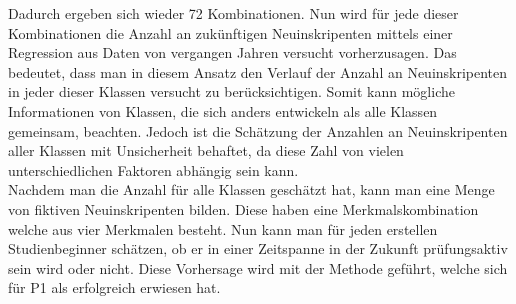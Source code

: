 \noindent Dadurch ergeben sich wieder 72 Kombinationen. Nun wird f\"ur jede dieser Kombinationen die Anzahl an zuk\"unftigen Neuinskripenten mittels einer Regression aus Daten von
vergangen Jahren versucht vorherzusagen. Das bedeutet, dass man in diesem Ansatz den Verlauf der Anzahl an Neuinskripenten in jeder dieser Klassen versucht zu
ber\"ucksichtigen. Somit kann m\"ogliche Informationen von Klassen, die sich anders entwickeln als alle Klassen gemeinsam, beachten. Jedoch ist die Sch\"atzung der
Anzahlen an Neuinskripenten aller Klassen mit Unsicherheit behaftet, da diese Zahl von vielen unterschiedlichen Faktoren abh\"angig sein kann. \\

\noindent Nachdem man die Anzahl f\"ur alle Klassen gesch\"atzt hat, kann man eine Menge von fiktiven Neuinskripenten bilden. Diese haben eine Merkmalskombination
welche aus vier Merkmalen besteht. Nun kann man f\"ur jeden erstellen Studienbeginner sch\"atzen, ob er in einer Zeitspanne in der Zukunft pr\"ufungsaktiv sein wird oder nicht.
Diese Vorhersage wird mit der Methode gef\"uhrt, welche sich f\"ur P1 als erfolgreich erwiesen hat.
